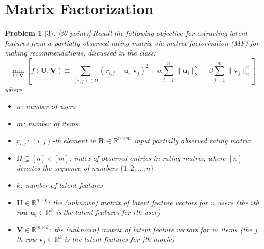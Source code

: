 \documentclass[12pt]{article}
\theoremstyle{quest}
\newtheorem*{problem}{Problem}
\begin{document}
\section*{Matrix Factorization}
\begin{problem}[3] [30 points]
Recall the following objective for extracting latent features from a partially observed rating matrix via matrix factorization (MF) for making recommendations, discussed in the class:
\begin{equation}
\label{eq:matrix_fac}
  \min_{\bm{U},\bm{V}}\left[f(\bm{U},\bm{V}) \equiv \sum_{(i,j)\in\Omega}(r_{i,j}-\bm{u}_i^{\top}\bm{v}_j)^2 + \alpha\sum_{i=1}^{n}\lVert\bm{u}_i\rVert_2^2 + \beta\sum_{j=1}^{m}\lVert\bm{v}_j\rVert_2^2 \right]  
\end{equation}
where
\begin{itemize}
    \item $n$: number of users 
    \item $m$: number of items
    \item $r_{i,j}$: $(i,j)$-th element in $\bm{R} \in \mathbb{R}^{n \times m}$ input partially observed rating matrix
    \item $\Omega \subseteq [n]\times[m]$: index of observed entries in rating matrix, where $[n]$ denotes the sequence of numbers $\{1,2,\dots,n\}$.
    \item $k$: number of latent features
    \item $\bm{U} \in \mathbb{R}^{n \times k}$: the (unknown) matrix of latent feature vectors for $n$ users (the $i$th row $\bm{u}_i \in \mathbb{R}^{k}$ is the latent features for $i$th user)
    \item $\bm{V} \in \mathbb{R}^{m \times k}$: the (unknown) matrix of latent feature vectors for $m$ items (the $j$th row $\bm{v}_j \in \mathbb{R}^{k}$ is the latent features for $j$th movie)
\end{itemize}


\end{problem}
\end{document}

